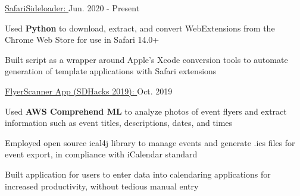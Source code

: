 
\begin{cventries}

  \cvproject
    {\href{https://github.com/hexalellogram/SafariSideloader}{SafariSideloader: }} %
    {Jun. 2020 - Present} %
    {
      \begin{cvitems} %
        \item {Used \textbf{Python} to download, extract, and convert WebExtensions from the Chrome Web Store for use in Safari 14.0+}
        \item {Built script as a wrapper around Apple's Xcode conversion tools to automate generation of template applications with Safari extensions}
      \end{cvitems}
    }

  \cvproject
    {\href{https://github.com/hexalellogram/FlyerScanner}{FlyerScanner App (SDHacks 2019): }} %
    {Oct. 2019} %
    {
      \begin{cvitems} %
        \item {Used \textbf{AWS Comprehend ML} to analyze photos of event flyers and extract information such as event titles, descriptions, dates, and times}
        \item {Employed open source ical4j library to manage events and generate .ics files for event export, in compliance with iCalendar standard}
        \item {Built application for users to enter data into calendaring applications for increased productivity, without tedious manual entry}
      \end{cvitems}
    }


\end{cventries}
